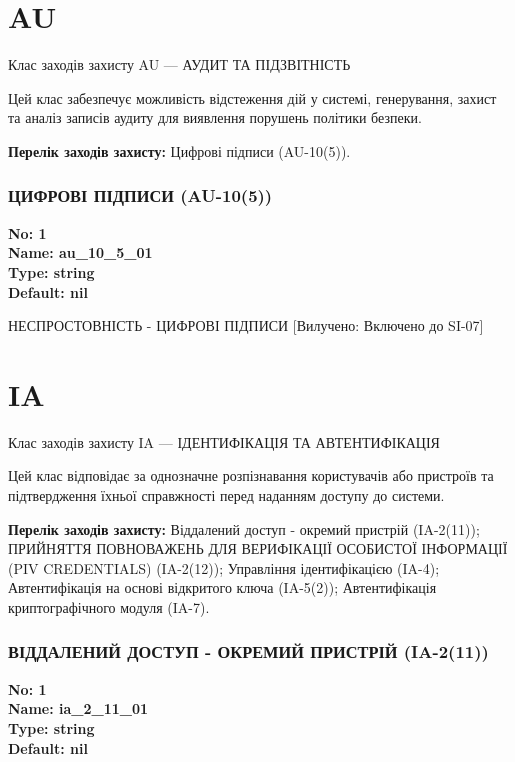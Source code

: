 \documentclass{article}
\begin{document}
\section{AU}
Клас заходів захисту AU --- АУДИТ ТА ПІДЗВІТНІСТЬ

Цей клас забезпечує можливість відстеження дій у системі, генерування, захист та аналіз записів аудиту для виявлення порушень політики безпеки.

\textbf{Перелік заходів захисту:} Цифрові підписи (AU-10(5)).

\subsubsection{ЦИФРОВІ ПІДПИСИ (AU-10(5))}


\vspace{10pt}
{\footnotesize\bfseries
No: 1\\
Name: au\_\allowbreak{}10\_\allowbreak{}5\_\allowbreak{}01\\
Type: string\\
Default: nil
}

{\footnotesize НЕСПРОСТОВНІСТЬ - ЦИФРОВІ ПІДПИСИ [Вилучено: Включено до SI-07]}




\section{IA}
Клас заходів захисту IA --- ІДЕНТИФІКАЦІЯ ТА АВТЕНТИФІКАЦІЯ

Цей клас відповідає за однозначне розпізнавання користувачів або пристроїв та підтвердження їхньої справжності перед наданням доступу до системи.

\textbf{Перелік заходів захисту:} Віддалений доступ - окремий пристрій (IA-2(11)); ПРИЙНЯТТЯ ПОВНОВАЖЕНЬ ДЛЯ ВЕРИФІКАЦІЇ ОСОБИСТОЇ ІНФОРМАЦІЇ (PIV CREDENTIALS) (IA-2(12)); Управління ідентифікацією (IA-4); Автентифікація на основі відкритого ключа (IA-5(2)); Автентифікація криптографічного модуля (IA-7).

\subsubsection{ВІДДАЛЕНИЙ ДОСТУП - ОКРЕМИЙ ПРИСТРІЙ (IA-2(11))}


\vspace{10pt}
{\footnotesize\bfseries
No: 1\\
Name: ia\_\allowbreak{}2\_\allowbreak{}11\_\allowbreak{}01\\
Type: string\\
Default: nil
}
\end{document}
